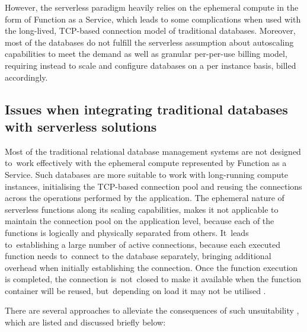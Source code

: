 However, the serverless paradigm heavily relies on the ephemeral compute in the form of Function as a Service, which leads to some complications when used with the long-lived, TCP-based connection model of traditional databases.
Moreover, most of the databases do not fulfill the serverless assumption about autoscaling capabilities to meet the demand as well as granular per-per-use billing model, requiring instead to scale and configure databases on a per instance basis, billed accordingly.

\subsection{Issues when integrating traditional databases with serverless solutions}

Most of the traditional relational database management systems are not designed to~work effectively with the ephemeral compute represented by Function as a Service.
Such databases are more suitable to work with long-running compute instances, initialising the TCP-based connection pool and reusing the connections across the operations performed by the application.
The ephemeral nature of serverless functions along its scaling capabilities, makes it not applicable to maintain the connection pool on the application level, because each of the functions is logically and physically separated from others.
It~leads to~establishing a large number of active connections, because each executed function needs to~connect to the database separately, bringing additional overhead when initially establishing the connection.
Once the function execution is completed, the connection is~not~closed to make it available when the function container will be reused, but~depending on load it may not be utilised \cite{WhyThePIETheoremIsMoreRelevantThanTheCAPTheorem}.

\newpage

There are several approaches to alleviate the consequences of such unsuitability \cite{BuildingResilientServerlessSystemsWithNonServerlessComponents}, which are listed and discussed briefly below:

